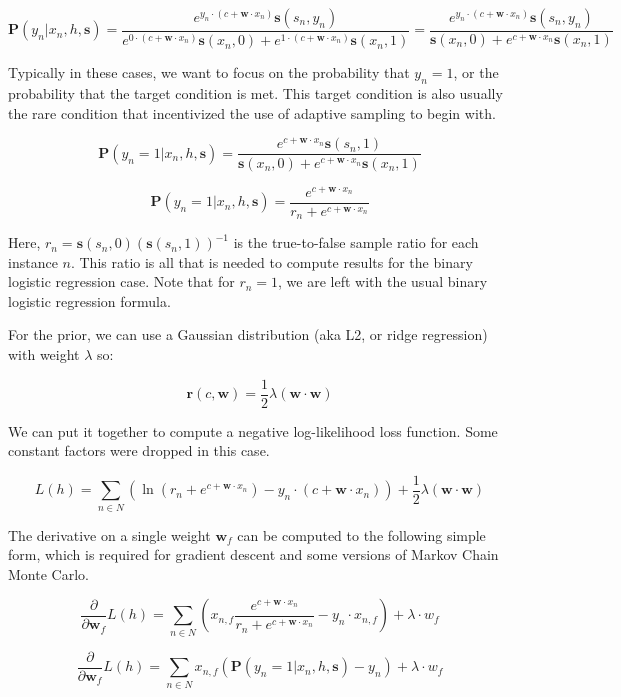 \documentclass[twoside]{article}
\begin{document}
\[\mathbf{P}(y_n|x_n,h,\mathbf{s})=\frac{e^{y_n \cdot (c+\mathbf{w} \cdot x_n)}\mathbf{s}(s_n,y_n)}{e^{0 \cdot (c+\mathbf{w} \cdot x_n)}\mathbf{s}(x_n,0)+e^{1 \cdot (c+\mathbf{w} \cdot x_n)}\mathbf{s}(x_n,1)}=\frac{e^{y_n \cdot (c+\mathbf{w} \cdot x_n)}\mathbf{s}(s_n,y_n)}{\mathbf{s}(x_n,0)+e^{c+\mathbf{w} \cdot x_n}\mathbf{s}(x_n,1)} \]

Typically in these cases, we want to focus on the probability that \(y_n = 1\), or the probability that the target condition is met. This target condition is also usually the rare condition that incentivized the use of adaptive sampling to begin with.

\[\mathbf{P}(y_n=1|x_n,h,\mathbf{s})=\frac{e^{c+\mathbf{w} \cdot x_n}\mathbf{s}(s_n,1)}{\mathbf{s}(x_n,0)+e^{c+\mathbf{w} \cdot x_n}\mathbf{s}(x_n,1)} \]

\[\mathbf{P}(y_n=1|x_n,h,\mathbf{s})=\frac{e^{c+\mathbf{w} \cdot x_n}}{r_n+e^{c+\mathbf{w} \cdot x_n}} \]

Here, \(r_n = \mathbf{s}(s_n,0)(\mathbf{s}(s_n,1))^{-1}\) is the true-to-false sample ratio for each instance \(n\). This ratio is all that is needed to compute results for the binary logistic regression case. Note that for \(r_n=1\), we are left with the usual binary logistic regression formula.

For the prior, we can use a Gaussian distribution (aka L2, or ridge regression) with weight \(\lambda\) so:

\[\mathbf{r}(c,\mathbf{w})=\frac{1}{2}\lambda(\mathbf{w} \cdot \mathbf{w})\]

We can put it together to compute a negative log-likelihood loss function. Some constant factors were dropped in this case.

\[L(h)=\sum_{n \in  N} \left (\ln\left (r_n+e^{c+\mathbf{w} \cdot x_n}\right ) -y_n \cdot (c+\mathbf{w} \cdot x_n) \right )+ \frac{1}{2}\lambda(\mathbf{w} \cdot \mathbf{w})\]

The derivative on a single weight \(\mathbf{w}_f\) can be computed to the following simple form, which is required for gradient descent and some versions of Markov Chain Monte Carlo.

\[\frac{\partial}{\partial \mathbf{w}_f }L(h)=\sum_{n \in  N} \left(x_{n,f}\frac{e^{c+\mathbf{w} \cdot x_n}}{r_n+e^{c+\mathbf{w} \cdot x_n}} -y_n \cdot x_{n,f} \right )+ \lambda \cdot w_f\] 

\[\frac{\partial}{\partial \mathbf{w}_f }L(h)= \sum_{n \in  N} x_{n,f}\left(\mathbf{P}(y_n=1|x_n,h,\mathbf{s}) -y_n  \right )+ \lambda \cdot w_f \]
\end{document}
